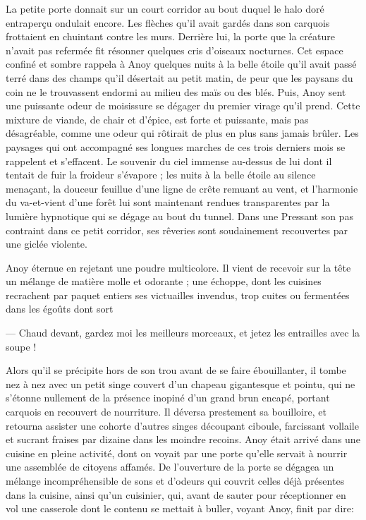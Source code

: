 La petite porte donnait sur un court corridor au bout duquel le halo
doré entraperçu ondulait encore. Les flèches qu'il avait gardés dans
son carquois frottaient en chuintant contre 
les murs. Derrière lui, la
porte que la créature n'avait pas refermée fit résonner quelques cris
d'oiseaux nocturnes. Cet espace confiné et sombre rappela à Anoy
quelques nuits à la belle étoile qu'il avait passé terré dans des
champs qu'il désertait au petit matin, de peur que les paysans du coin
ne le trouvassent endormi au milieu des maïs ou des blés. Puis, Anoy
sent une puissante odeur de moisissure se dégager du premier virage
qu'il prend. Cette mixture de viande, de chair et d'épice, est forte
et puissante, mais pas désagréable, comme une odeur qui rôtirait de
plus en plus sans jamais brûler.  Les paysages qui ont accompagné ses
longues marches de ces trois derniers mois se rappelent et
s'effacent. Le souvenir du ciel immense au-dessus de lui dont il
tentait de fuir la froideur s'évapore ; les nuits à la belle étoile au
silence menaçant, la douceur feuillue d'une ligne de crête remuant au
vent, et l'harmonie du va-et-vient d'une forêt lui sont maintenant
rendues transparentes par la lumière hypnotique qui se dégage au bout
du tunnel. Dans une Pressant son pas contraint dans ce petit corridor,
ses rêveries sont soudainement recouvertes par une giclée violente.

Anoy éternue en rejetant une poudre multicolore. Il vient de recevoir
sur la tête un mélange de matière molle et odorante ; une échoppe,
dont les cuisines recrachent par paquet entiers ses victuailles
invendus, trop cuites ou fermentées dans les égoûts dont sort

--- Chaud devant, gardez moi les meilleurs morceaux, et jetez les
entrailles avec la soupe !

Alors qu'il se précipite hors de son trou avant de se faire
ébouillanter, il tombe nez à nez avec un petit singe couvert d'un
chapeau gigantesque et pointu, qui ne s'étonne nullement de la
présence inopiné d'un grand brun encapé, portant carquois en recouvert
de nourriture. Il déversa prestement sa bouilloire, et retourna
assister une cohorte d'autres singes découpant ciboule, farcissant
vollaile et sucrant fraises par dizaine dans les moindre recoins. Anoy
était arrivé dans une cuisine en pleine activité, dont on voyait par
une porte qu'elle servait à nourrir une assemblée de citoyens
affamés. De l'ouverture de la porte se dégagea un mélange
incompréhensible de sons et d'odeurs qui couvrit celles déjà présentes
dans la cuisine, ainsi qu'un cuisinier, qui, avant de sauter pour
réceptionner en vol une casserole dont le contenu se mettait à buller,
voyant Anoy, finit par dire:

